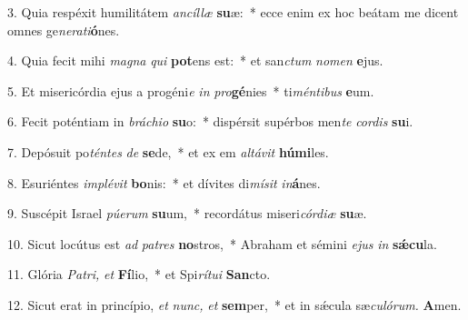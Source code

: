\item 3. Quia respéxit humilitátem \textit{ancíllæ} \textbf{su}æ:~* ecce enim ex hoc beátam me dicent omnes ge\textit{nerati}\textbf{ó}nes.

\item 4. Quia fecit mihi \textit{magna} \textit{qui} \textbf{pot}ens est:~* et san\textit{ctum} \textit{nomen} \textbf{e}jus.

\item 5. Et misericórdia ejus a progéni\textit{e} \textit{in} \textit{pro}\textbf{gé}nies~* ti\textit{méntibus} \textbf{e}um.

\item 6. Fecit poténtiam in \textit{bráchio} \textbf{su}o:~* dispérsit supérbos men\textit{te} \textit{cordis} \textbf{su}i.

\item 7. Depósuit po\textit{téntes} \textit{de} \textbf{se}de,~* et ex em \textit{altávit} \textbf{hú}\textbf{mi}les.

\item 8. Esuriéntes \textit{implévit} \textbf{bo}nis:~* et dívites di\textit{mísit} \textit{in}\textbf{á}nes.

\item 9. Suscépit Israel \textit{púerum} \textbf{su}um,~* recordátus miseri\hspace{0.03em}\textit{córdiæ} \textbf{su}æ.

\item 10. Sicut locútus est \textit{ad} \textit{patres} \textbf{no}stros,~* Abraham et sémini \textit{ejus} \textit{in} \textbf{sǽ}\textbf{cu}la.

\item 11. Glória \textit{Patri,} \textit{et} \textbf{Fí}lio,~* et Spi\textit{rítui} \textbf{San}cto.

\item 12. Sicut erat in princípio, \textit{et} \textit{nunc,} \textit{et} \textbf{sem}per,~* et in sǽcula sæ\hspace{0.03em}\textit{culórum.} \textbf{A}men.
